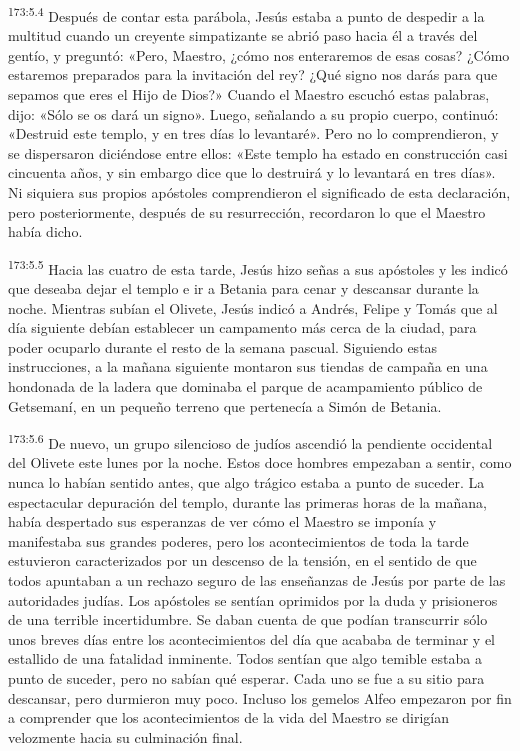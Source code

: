 \par 
\textsuperscript{173:5.4} Después de contar esta parábola, Jesús estaba a punto de despedir a la multitud cuando un creyente simpatizante se abrió paso hacia él a través del gentío, y preguntó: «Pero, Maestro, ¿cómo nos enteraremos de esas cosas? ¿Cómo estaremos preparados para la invitación del rey? ¿Qué signo nos darás para que sepamos que eres el Hijo de Dios?» Cuando el Maestro escuchó estas palabras, dijo: «Sólo se os dará un signo». Luego, señalando a su propio cuerpo, continuó: «Destruid este templo, y en tres días lo levantaré». Pero no lo comprendieron, y se dispersaron diciéndose entre ellos: «Este templo ha estado en construcción casi cincuenta años, y sin embargo dice que lo destruirá y lo levantará en tres días». Ni siquiera sus propios apóstoles comprendieron el significado de esta declaración, pero posteriormente, después de su resurrección, recordaron lo que el Maestro había dicho.

\par 
\textsuperscript{173:5.5} Hacia las cuatro de esta tarde, Jesús hizo señas a sus apóstoles y les indicó que deseaba dejar el templo e ir a Betania para cenar y descansar durante la noche. Mientras subían el Olivete, Jesús indicó a Andrés, Felipe y Tomás que al día siguiente debían establecer un campamento más cerca de la ciudad, para poder ocuparlo durante el resto de la semana pascual. Siguiendo estas instrucciones, a la mañana siguiente montaron sus tiendas de campaña en una hondonada de la ladera que dominaba el parque de acampamiento público de Getsemaní, en un pequeño terreno que pertenecía a Simón de Betania.

\par 
\textsuperscript{173:5.6} De nuevo, un grupo silencioso de judíos ascendió la pendiente occidental del Olivete este lunes por la noche. Estos doce hombres empezaban a sentir, como nunca lo habían sentido antes, que algo trágico estaba a punto de suceder. La espectacular depuración del templo, durante las primeras horas de la mañana, había despertado sus esperanzas de ver cómo el Maestro se imponía y manifestaba sus grandes poderes, pero los acontecimientos de toda la tarde estuvieron caracterizados por un descenso de la tensión, en el sentido de que todos apuntaban a un rechazo seguro de las enseñanzas de Jesús por parte de las autoridades judías. Los apóstoles se sentían oprimidos por la duda y prisioneros de una terrible incertidumbre. Se daban cuenta de que podían transcurrir sólo unos breves días entre los acontecimientos del día que acababa de terminar y el estallido de una fatalidad inminente. Todos sentían que algo temible estaba a punto de suceder, pero no sabían qué esperar. Cada uno se fue a su sitio para descansar, pero durmieron muy poco. Incluso los gemelos Alfeo empezaron por fin a comprender que los acontecimientos de la vida del Maestro se dirigían velozmente hacia su culminación final.